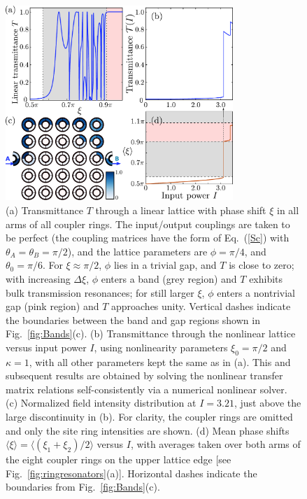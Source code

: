 \documentclass[aps,prx,twocolumn,superscriptaddress]{revtex4-1}
\newcommand{\figwidth}{8.6cm}
\begin{document}
\begin{figure}
  \centering
  \includegraphics[width=\figwidth]{fig_wy/Trans_psi_1.pdf}
  \caption{(a) Transmittance $T$ through a linear lattice with phase shift $\xi$ in all arms of all coupler rings.  The input/output couplings are taken to be perfect (the coupling matrices have the form of Eq.~(\ref{Sc}) with $\theta_A = \theta_B = \pi/2$), and the lattice parameters are $\phi = \pi/4$, and $\theta_0 = \pi/6$.  For $\xi \approx \pi/2$, $\phi$ lies in a trivial gap, and $T$ is close to zero; with increasing $\Delta \xi$, $\phi$ enters a band (grey region) and $T$ exhibits bulk transmission resonances; for still larger $\xi$, $\phi$ enters a nontrivial gap (pink region) and $T$ approaches unity.  Vertical dashes indicate the boundaries between the band and gap regions shown in Fig.~\ref{fig:Bands}(c).  (b) Transmittance through the nonlinear lattice versus input power $I$, using nonlinearity parameters $\xi_0 = \pi/2$ and $\kappa = 1$, with all other parameters kept the same as in (a).  This and subsequent results are obtained by solving the nonlinear transfer matrix relations self-consistently via a numerical nonlinear solver.  (c) Normalized field intensity distribution at $I = 3.21$, just above the large discontinuity in (b).  For clarity, the coupler rings are omitted and only the site ring intensities are shown. (d) Mean phase shifts $\langle\xi\rangle = \langle(\xi_1+\xi_2)/2\rangle$ versus $I$, with averages taken over both arms of the eight coupler rings on the upper lattice edge [see Fig.~\ref{fig:ringresonators}(a)].  Horizontal dashes indicate the boundaries from Fig.~\ref{fig:Bands}(c).}
  \label{fig:Trans_I_psi}
\end{figure}
\end{document}
